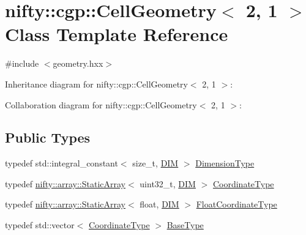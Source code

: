 \hypertarget{classnifty_1_1cgp_1_1CellGeometry_3_012_00_011_01_4}{}\section{nifty\+:\+:cgp\+:\+:Cell\+Geometry$<$ 2, 1 $>$ Class Template Reference}
\label{classnifty_1_1cgp_1_1CellGeometry_3_012_00_011_01_4}


{\ttfamily \#include $<$geometry.\+hxx$>$}



Inheritance diagram for nifty\+:\+:cgp\+:\+:Cell\+Geometry$<$ 2, 1 $>$\+:


Collaboration diagram for nifty\+:\+:cgp\+:\+:Cell\+Geometry$<$ 2, 1 $>$\+:
\subsection*{Public Types}
\begin{DoxyCompactItemize}
\item 
typedef std\+::integral\+\_\+constant$<$ size\+\_\+t, \hyperlink{classnifty_1_1cgp_1_1CellGeometry_3_012_00_011_01_4_a42d125e23384bc4a770893276750d9d1}{D\+I\+M} $>$ \hyperlink{classnifty_1_1cgp_1_1CellGeometry_3_012_00_011_01_4_a35fae8ad3031bc0765ecb4d56cbff171}{Dimension\+Type}
\item 
typedef \hyperlink{namespacenifty_1_1array_a683f151f19c851754e0c6d55ed16a0c2}{nifty\+::array\+::\+Static\+Array}$<$ uint32\+\_\+t, \hyperlink{classnifty_1_1cgp_1_1CellGeometry_3_012_00_011_01_4_a42d125e23384bc4a770893276750d9d1}{D\+I\+M} $>$ \hyperlink{classnifty_1_1cgp_1_1CellGeometry_3_012_00_011_01_4_a61e8ffb089e3ca4bf7998e77dfc278bc}{Coordinate\+Type}
\item 
typedef \hyperlink{namespacenifty_1_1array_a683f151f19c851754e0c6d55ed16a0c2}{nifty\+::array\+::\+Static\+Array}$<$ float, \hyperlink{classnifty_1_1cgp_1_1CellGeometry_3_012_00_011_01_4_a42d125e23384bc4a770893276750d9d1}{D\+I\+M} $>$ \hyperlink{classnifty_1_1cgp_1_1CellGeometry_3_012_00_011_01_4_aa894ce050b43284dac01b3963e2e1e47}{Float\+Coordinate\+Type}
\item 
typedef std\+::vector$<$ \hyperlink{classnifty_1_1cgp_1_1CellGeometry_3_012_00_011_01_4_a61e8ffb089e3ca4bf7998e77dfc278bc}{Coordinate\+Type} $>$ \hyperlink{classnifty_1_1cgp_1_1CellGeometry_3_012_00_011_01_4_a10f7d7a27ef9080c3a94fc69a258c55e}{Base\+Type}
\end{DoxyCompactItemize}
